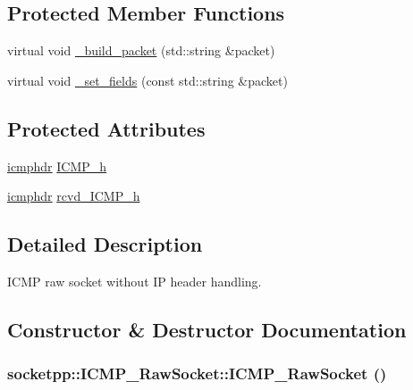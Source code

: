 \subsection*{Protected Member Functions}
\begin{CompactItemize}
\item 
virtual void \hyperlink{classsocketpp_1_1ICMP__RawSocket_d8aa8d45c57eb77ab99ee84f1c5dd7da}{\_\-build\_\-packet} (std::string \&packet)
\item 
virtual void \hyperlink{classsocketpp_1_1ICMP__RawSocket_e183b11c080f5d74dbc386ec53e7feb5}{\_\-set\_\-fields} (const std::string \&packet)
\end{CompactItemize}
\subsection*{Protected Attributes}
\begin{CompactItemize}
\item 
\hyperlink{structsocketpp_1_1icmphdr}{icmphdr} \hyperlink{classsocketpp_1_1ICMP__RawSocket_31f1ab3a8beaf8d4cb5b192e644e3f33}{ICMP\_\-h}
\item 
\hyperlink{structsocketpp_1_1icmphdr}{icmphdr} \hyperlink{classsocketpp_1_1ICMP__RawSocket_1304716643ef2274b8c1c195359110c6}{rcvd\_\-ICMP\_\-h}
\end{CompactItemize}


\subsection{Detailed Description}
ICMP raw socket without IP header handling. 

\subsection{Constructor \& Destructor Documentation}
\hypertarget{classsocketpp_1_1ICMP__RawSocket_bed3b5ca33a0f7b4be42a9e6167266c0}{
\subsubsection[{ICMP\_\-RawSocket}]{\setlength{\rightskip}{0pt plus 5cm}socketpp::ICMP\_\-RawSocket::ICMP\_\-RawSocket ()}}
\label{classsocketpp_1_1ICMP__RawSocket_bed3b5ca33a0f7b4be42a9e6167266c0}


